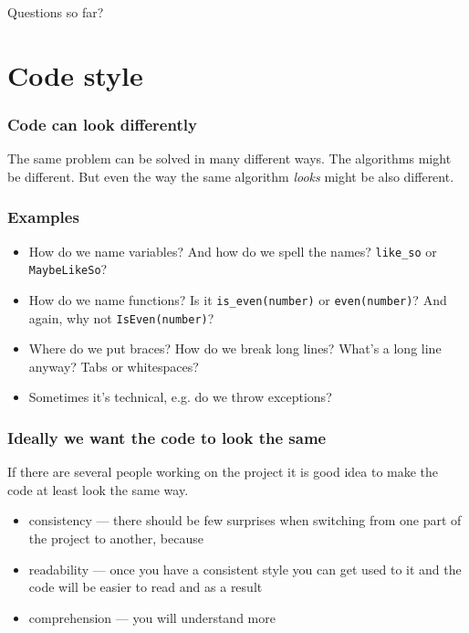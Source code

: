 \documentclass[compress,english,aspectratio=1610]{beamer}
\let\olditem\item
\renewcommand{\item}{\setlength{\itemsep}{\fill}\olditem}
\begin{document}
\begin{frame}
  \centering
  Questions so far?
\end{frame}


\section{Code style}

\begin{frame}
  \frametitle{Code can look differently}
  The same problem can be solved in many different ways. The algorithms might be different. But even the way the same algorithm \textit{looks} might be also different.
\end{frame}

\begin{frame}
  \frametitle{Examples}
  \begin{itemize}
  \item How do we name variables? And how do we spell the names? \texttt{like\_so} or \texttt{MaybeLikeSo}?
  \item How do we name functions? Is it \texttt{is\_even(number)} or \texttt{even(number)}? And again, why not \texttt{IsEven(number)}?
  \item Where do we put braces? How do we break long lines? What's a long line anyway? Tabs or whitespaces?
  \item Sometimes it's technical, e.g. do we throw exceptions?
  \end{itemize}
\end{frame}

\begin{frame}
  \frametitle{Ideally we want the code to look the same}
  If there are several people working on the project it is good idea to make the code at least look the same way.
  \begin{itemize}
  	\item consistency --- there should be few surprises when switching from one part of the project to another, because
  	\item readability --- once you have a consistent style you can get used to it and the code will be easier to read and as a result
  	\item comprehension --- you will understand more
  \end{itemize}
\end{frame}
\end{document}
